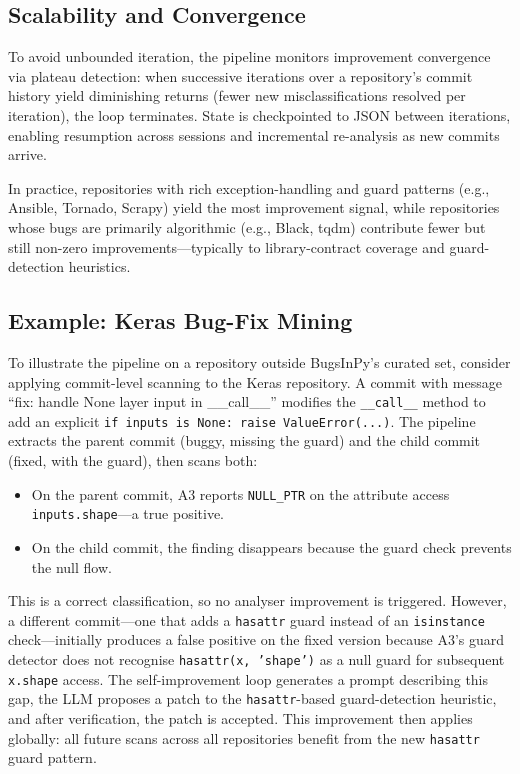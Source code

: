 \documentclass[sigconf,review,anonymous]{acmart}
\begin{document}
\subsection{Scalability and Convergence}

To avoid unbounded iteration, the pipeline monitors improvement convergence via plateau detection: when successive iterations over a repository's commit history yield diminishing returns (fewer new misclassifications resolved per iteration), the loop terminates.
State is checkpointed to JSON between iterations, enabling resumption across sessions and incremental re-analysis as new commits arrive.

In practice, repositories with rich exception-handling and guard patterns (e.g., Ansible, Tornado, Scrapy) yield the most improvement signal, while repositories whose bugs are primarily algorithmic (e.g., Black, tqdm) contribute fewer but still non-zero improvements---typically to library-contract coverage and guard-detection heuristics.

\subsection{Example: Keras Bug-Fix Mining}

To illustrate the pipeline on a repository outside BugsInPy's curated set, consider applying commit-level scanning to the Keras repository.
A commit with message ``fix: handle None layer input in \_\_call\_\_'' modifies the \texttt{\_\_call\_\_} method to add an explicit \texttt{if inputs is None: raise ValueError(...)}.
The pipeline extracts the parent commit (buggy, missing the guard) and the child commit (fixed, with the guard), then scans both:

\begin{itemize}
  \item On the parent commit, \textsc{A3} reports \texttt{NULL\_PTR} on the attribute access \texttt{inputs.shape}---a true positive.
  \item On the child commit, the finding disappears because the guard check prevents the null flow.
\end{itemize}

This is a correct classification, so no analyser improvement is triggered.
However, a different commit---one that adds a \texttt{hasattr} guard instead of an \texttt{isinstance} check---initially produces a false positive on the fixed version because \textsc{A3}'s guard detector does not recognise \texttt{hasattr(x, 'shape')} as a null guard for subsequent \texttt{x.shape} access.
The self-improvement loop generates a prompt describing this gap, the LLM proposes a patch to the \texttt{hasattr}-based guard-detection heuristic, and after verification, the patch is accepted.
This improvement then applies globally: all future scans across all repositories benefit from the new \texttt{hasattr} guard pattern.
\end{document}

